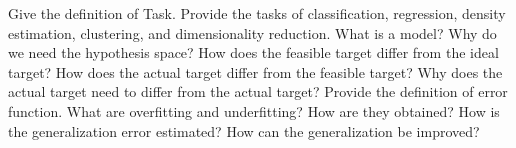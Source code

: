 \newpage
\begin{exercise}[topsep=20pt, itemsep=10pt]
    \ex Give the definition of Task. Provide the tasks of classification, regression, density estimation, clustering, and dimensionality reduction.
    \ex What is a model? Why do we need the hypothesis space?
    \ex How does the feasible target differ from the ideal target? How does the actual target differ from the feasible target? Why does the actual target need to differ from the actual target?
    \ex Provide the definition of error function.
    \ex What are overfitting and underfitting? How are they obtained?
    \ex How is the generalization error estimated?
    \ex How can the generalization be improved?
\end{exercise}